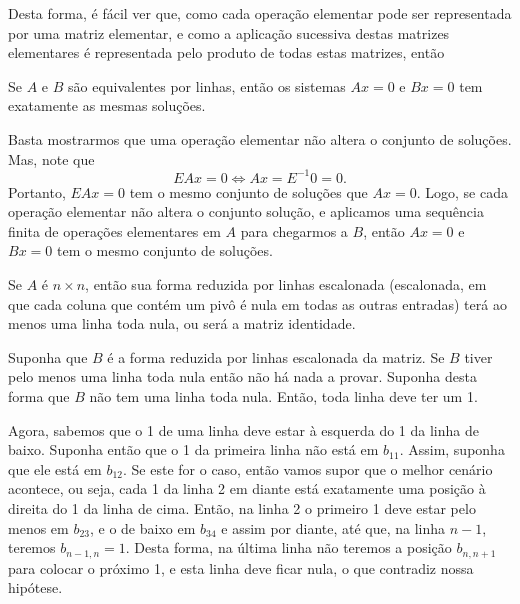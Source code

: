Desta forma, é fácil ver que, como cada operação elementar pode ser
representada por uma matriz elementar, e como a aplicação sucessiva destas matrizes elementares é representada pelo produto de todas estas matrizes, então 

\begin{center}
\end{center}

\begin{teo}
   Se $A$ e $B$ são equivalentes por linhas, então os sistemas $Ax = 0$ e $Bx = 0$ tem exatamente as mesmas soluções.
\end{teo}
\bpr
	Basta mostrarmos que uma operação elementar não altera o conjunto de soluções. Mas, note que 
	\begin{equation*}
    	EAx = 0 \Leftrightarrow Ax = E^{-1}0 = 0.
    \end{equation*}
	Portanto, $EAx = 0$ tem o mesmo conjunto de soluções que $Ax=0$. Logo, se cada operação elementar não altera o conjunto solução, e aplicamos uma sequência finita de operações elementares em $A$ para chegarmos a $B$, então $Ax=0$ e $Bx=0$ tem o mesmo conjunto de soluções.
\epr

\begin{teo}
   Se $A$ é $n\times n$, então sua forma reduzida por linhas escalonada (escalonada, em que cada coluna que contém um pivô é nula em todas as outras entradas) terá ao menos uma linha toda nula, ou será a matriz identidade.
\end{teo}
\bpr
Suponha que $B$ é a forma reduzida por linhas escalonada da matriz. Se $B$ tiver pelo menos uma linha toda nula então não há nada a provar. Suponha desta forma que $B$ não tem uma linha toda nula. Então, toda linha deve ter um 1.
 
Agora, sabemos que o 1 de uma linha deve estar à esquerda do 1 da linha de baixo. Suponha então que o 1 da primeira linha não está em $b_{11}$. Assim, suponha que ele está em $b_{12}$. Se este for o caso, então vamos supor que o melhor cenário acontece, ou seja, cada 1 da linha 2 em diante está exatamente uma posição à direita do 1 da linha de cima. Então, na linha 2 o primeiro 1 deve estar pelo menos em $b_{23}$, e o de baixo em $b_{34}$ e assim por diante, até que, na linha $n-1$, teremos $b_{n-1,n} = 1$. Desta forma, na última linha não teremos a posição $b_{n,n+1}$ para colocar o próximo 1, e esta linha deve ficar nula, o que contradiz nossa hipótese.

